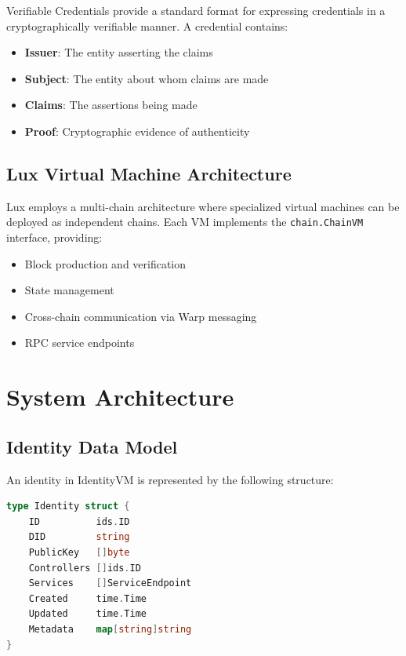 \documentclass[11pt,twocolumn]{article}
\begin{document}
Verifiable Credentials provide a standard format for expressing credentials in a cryptographically verifiable manner. A credential contains:

\begin{itemize}
\item \textbf{Issuer}: The entity asserting the claims
\item \textbf{Subject}: The entity about whom claims are made
\item \textbf{Claims}: The assertions being made
\item \textbf{Proof}: Cryptographic evidence of authenticity
\end{itemize}

\subsection{Lux Virtual Machine Architecture}

Lux employs a multi-chain architecture where specialized virtual machines can be deployed as independent chains. Each VM implements the \texttt{chain.ChainVM} interface, providing:

\begin{itemize}
\item Block production and verification
\item State management
\item Cross-chain communication via Warp messaging
\item RPC service endpoints
\end{itemize}

\section{System Architecture}

\subsection{Identity Data Model}

An identity in IdentityVM is represented by the following structure:

\begin{lstlisting}[language=Go,basicstyle=\ttfamily\small]
type Identity struct {
    ID          ids.ID
    DID         string
    PublicKey   []byte
    Controllers []ids.ID
    Services    []ServiceEndpoint
    Created     time.Time
    Updated     time.Time
    Metadata    map[string]string
}
\end{lstlisting}
\end{document}
